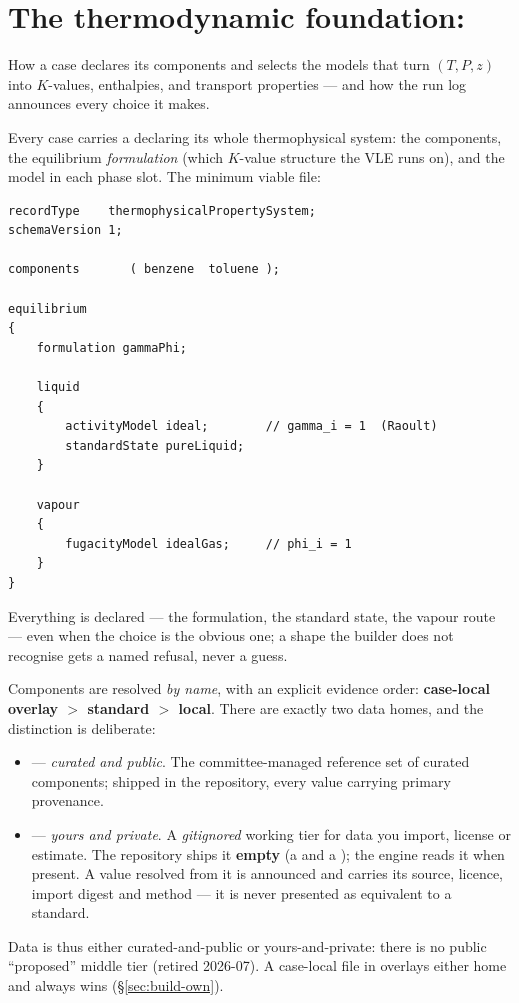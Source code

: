 \documentclass[11pt,a4paper]{article}
\begin{document}
\section{The thermodynamic foundation: }\label{sec:thermo}

\begin{whatyoulllearn}
How a case declares its components and selects the models that turn
$(T,P,z)$ into $K$-values, enthalpies, and transport properties --- and
how the run log announces every choice it makes.
\end{whatyoulllearn}

Every case carries a  declaring its
whole thermophysical system: the components, the equilibrium
\emph{formulation} (which $K$-value structure the VLE runs on), and the
model in each phase slot.  The minimum viable file:

\begin{lstlisting}[language=dict]
recordType    thermophysicalPropertySystem;
schemaVersion 1;

components       ( benzene  toluene );

equilibrium
{
    formulation gammaPhi;

    liquid
    {
        activityModel ideal;        // gamma_i = 1  (Raoult)
        standardState pureLiquid;
    }

    vapour
    {
        fugacityModel idealGas;     // phi_i = 1
    }
}
\end{lstlisting}

Everything is declared --- the formulation, the standard state, the
vapour route --- even when the choice is the obvious one; a shape the
builder does not recognise gets a named refusal, never a guess.

Components are resolved \emph{by name}, with an explicit evidence order:
\textbf{case-local overlay $>$ standard $>$ local}.  There are exactly two
data homes, and the distinction is deliberate:
\begin{itemize}
  \item \textbf{} --- \emph{curated and public}.  The
    committee-managed reference set of curated components; shipped in the repository,
    every value carrying primary provenance.
  \item \textbf{} --- \emph{yours and private}.  A
    \emph{gitignored} working tier for data you import, license or estimate.
    The repository ships it \textbf{empty} (a  and a
    ); the engine reads it when present.  A value resolved from
    it is announced  and carries its source, licence,
    import digest and method --- it is never presented as equivalent to a
    standard.
\end{itemize}
Data is thus either curated-and-public or yours-and-private: there is no public
``proposed'' middle tier (retired 2026-07).  A case-local file in
 overlays either home and always wins
(\S\ref{sec:build-own}).
\end{document}
